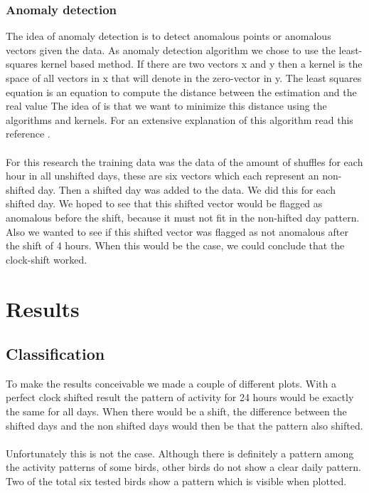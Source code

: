 \documentclass[a4paper]{article}
\begin{document}
\subsubsection*{Anomaly detection}
The idea of anomaly detection is to detect anomalous points or anomalous vectors given the data. As anomaly detection algorithm we chose to use the least-squares kernel based method. If there are two vectors x and y then a kernel is the space of all vectors in x that will denote in the zero-vector in y. The least squares equation is an equation to compute the distance between the estimation and the real value The idea of is that we want to minimize this distance using the algorithms and kernels. For an extensive explanation of this algorithm read this reference \cite{engel2004kernel}.\\\\
For this research the training data was the data of the amount of shuffles for each hour in all unshifted days, these are six vectors which each represent an non-shifted day. Then a shifted day was added to the data. We did this for each shifted day. We hoped to see that this shifted vector would be flagged as anomalous before the shift, because it must not fit in the non-hifted day pattern. Also we wanted to see if this shifted vector was flagged as not anomalous after the shift of 4 hours. When this would be the case, we could conclude that the clock-shift worked.
\section*{Results}

\subsection*{Classification}
To make the results conceivable we made a couple of different plots. With a perfect clock shifted result the pattern of activity for 24 hours would be exactly the same for all days. When there would be a shift, the difference between the shifted days and the non shifted days would then be that the pattern also shifted. \\ \\
Unfortunately this is not the case. Although there is definitely a pattern among the activity patterns of some birds, other birds do not show a clear daily pattern. Two of the total six tested birds show a pattern which is visible when plotted.
\end{document}
